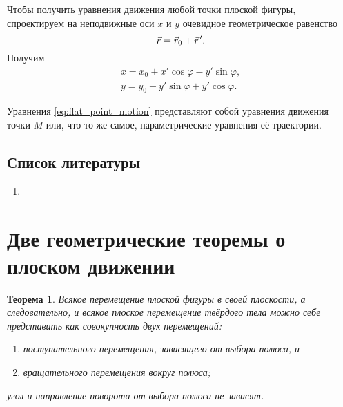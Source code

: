 \documentclass{article}
\theoremstyle{definition}
\theoremstyle{plain}
\newtheorem{theorem}{Теорема}[section]
\theoremstyle{remark}
\numberwithin{equation}{section}
\newcommand{\wvec}[1]{\vec{#1}\mkern2mu\vphantom{#1}}
\newcommand{\pvec}[1]{\wvec{#1}'}
\begin{document}
Чтобы получить уравнения движения любой точки плоской фигуры, спроектируем на
неподвижные оси $x$ и $y$ очевидное геометрическое равенство
\begin{equation*}
  \vec{r} = \vec{r}_0 + \pvec{r}.
\end{equation*}
Получим
\begin{equation}
  \label{eq:flat_point_motion}
  \begin{gathered}
    x = x_0 + x' \cos\varphi - y' \sin\varphi, \\
    y = y_0 + y' \sin\varphi + y' \cos\varphi.
  \end{gathered}
\end{equation}

Уравнения \ref{eq:flat_point_motion} представляют собой уравнения движения точки
$M$ или, что то же самое, параметрические уравнения её траектории.

\subsection{Список литературы}
\begin{enumerate}
  \item \cite{lourie}
\end{enumerate}

\pagebreak


\section{Две геометрические теоремы о плоском движении}

\begin{theorem}
  Всякое перемещение плоской фигуры в своей плоскости, а следовательно, и всякое
  плоское перемещение твёрдого тела можно себе представить как совокупность двух
  перемещений:
  \begin{enumerate}
    \item поступательного перемещения, зависящего от выбора полюса, и
    \item вращательного перемещения вокруг полюса;
  \end{enumerate}
  угол и направление поворота от выбора полюса не зависят.
\end{theorem}
\end{document}
